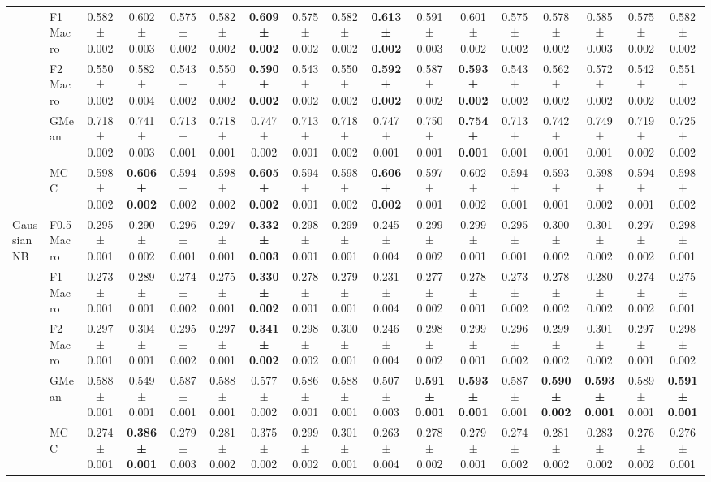\begin{table}[H]
{\begin{tabular}{llccccccccccccccc}
 & F1 Macro & 0.582 ± 0.002 & 0.602 ± 0.003 & 0.575 ± 0.002 & 0.582 ± 0.002 & \textbf{0.609 ± 0.002} & 0.575 ± 0.002 & 0.582 ± 0.002 & \textbf{0.613 ± 0.002} & 0.591 ± 0.003 & 0.601 ± 0.002 & 0.575 ± 0.002 & 0.578 ± 0.002 & 0.585 ± 0.003 & 0.575 ± 0.002 & 0.582 ± 0.002 \\
 & F2 Macro & 0.550 ± 0.002 & 0.582 ± 0.004 & 0.543 ± 0.002 & 0.550 ± 0.002 & \textbf{0.590 ± 0.002} & 0.543 ± 0.002 & 0.550 ± 0.002 & \textbf{0.592 ± 0.002} & 0.587 ± 0.002 & \textbf{0.593 ± 0.002} & 0.543 ± 0.002 & 0.562 ± 0.002 & 0.572 ± 0.002 & 0.542 ± 0.002 & 0.551 ± 0.002 \\
 & GMean & 0.718 ± 0.002 & 0.741 ± 0.003 & 0.713 ± 0.001 & 0.718 ± 0.001 & 0.747 ± 0.002 & 0.713 ± 0.001 & 0.718 ± 0.002 & 0.747 ± 0.001 & 0.750 ± 0.001 & \textbf{0.754 ± 0.001} & 0.713 ± 0.001 & 0.742 ± 0.001 & 0.749 ± 0.001 & 0.719 ± 0.002 & 0.725 ± 0.002 \\
 & MCC & 0.598 ± 0.002 & \textbf{0.606 ± 0.002} & 0.594 ± 0.002 & 0.598 ± 0.002 & \textbf{0.605 ± 0.002} & 0.594 ± 0.001 & 0.598 ± 0.002 & \textbf{0.606 ± 0.002} & 0.597 ± 0.001 & 0.602 ± 0.002 & 0.594 ± 0.001 & 0.593 ± 0.001 & 0.598 ± 0.002 & 0.594 ± 0.001 & 0.598 ± 0.002 \\
\cline{1-17}
\multirow[t]{5}{*}{GaussianNB} & F0.5 Macro & 0.295 ± 0.001 & 0.290 ± 0.002 & 0.296 ± 0.001 & 0.297 ± 0.001 & \textbf{0.332 ± 0.003} & 0.298 ± 0.001 & 0.299 ± 0.001 & 0.245 ± 0.004 & 0.299 ± 0.002 & 0.299 ± 0.001 & 0.295 ± 0.001 & 0.300 ± 0.002 & 0.301 ± 0.002 & 0.297 ± 0.002 & 0.298 ± 0.001 \\
 & F1 Macro & 0.273 ± 0.001 & 0.289 ± 0.001 & 0.274 ± 0.002 & 0.275 ± 0.001 & \textbf{0.330 ± 0.002} & 0.278 ± 0.001 & 0.279 ± 0.001 & 0.231 ± 0.004 & 0.277 ± 0.002 & 0.278 ± 0.001 & 0.273 ± 0.002 & 0.278 ± 0.002 & 0.280 ± 0.002 & 0.274 ± 0.002 & 0.275 ± 0.001 \\
 & F2 Macro & 0.297 ± 0.001 & 0.304 ± 0.001 & 0.295 ± 0.002 & 0.297 ± 0.001 & \textbf{0.341 ± 0.002} & 0.298 ± 0.002 & 0.300 ± 0.001 & 0.246 ± 0.004 & 0.298 ± 0.002 & 0.299 ± 0.001 & 0.296 ± 0.002 & 0.299 ± 0.002 & 0.301 ± 0.002 & 0.297 ± 0.001 & 0.298 ± 0.002 \\
 & GMean & 0.588 ± 0.001 & 0.549 ± 0.001 & 0.587 ± 0.001 & 0.588 ± 0.001 & 0.577 ± 0.002 & 0.586 ± 0.001 & 0.588 ± 0.001 & 0.507 ± 0.003 & \textbf{0.591 ± 0.001} & \textbf{0.593 ± 0.001} & 0.587 ± 0.001 & \textbf{0.590 ± 0.002} & \textbf{0.593 ± 0.001} & 0.589 ± 0.001 & \textbf{0.591 ± 0.001} \\
 & MCC & 0.274 ± 0.001 & \textbf{0.386 ± 0.001} & 0.279 ± 0.003 & 0.281 ± 0.002 & 0.375 ± 0.002 & 0.299 ± 0.002 & 0.301 ± 0.001 & 0.263 ± 0.004 & 0.278 ± 0.002 & 0.279 ± 0.001 & 0.274 ± 0.002 & 0.281 ± 0.002 & 0.283 ± 0.002 & 0.276 ± 0.002 & 0.276 ± 0.001 \\

\end{tabular}}
\end{table}
